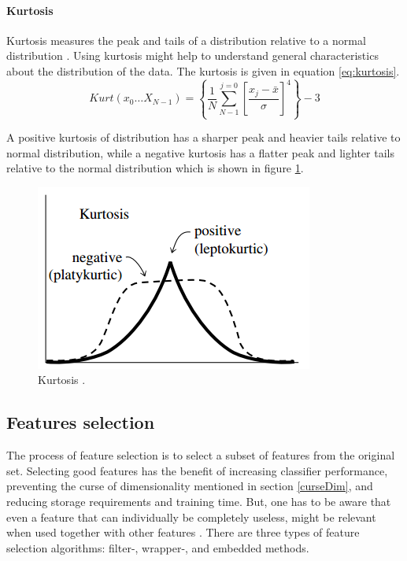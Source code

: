 \documentclass[USenglish]{ifimaster}  %
\begin{document}
	\FloatBarrier
	
\paragraph{Kurtosis}
Kurtosis measures the peak and tails of a distribution relative to a normal distribution \cite{Press:2007:NRE:1403886}. Using kurtosis might help to understand general characteristics about the distribution of the data. The kurtosis is given in equation \ref{eq:kurtosis}.
	\begin{equation}
	Kurt(x_0\dotsc X_{N-1}) = \left \{\frac{1}{N}\sum_{N-1}^{j=0}\left [ \frac{x_j-\bar{x}}{\sigma} \right ]^4 \right \}-3
	\label{eq:kurtosis}
	\end{equation}
	
A positive kurtosis of distribution has a sharper peak and heavier tails relative to normal distribution, while a negative kurtosis has a flatter peak and lighter tails relative to the normal distribution which is shown in figure \ref{fig:kurtosis}.
	
	\begin{figure}[h]
		\centering
		\includegraphics[scale=0.8]{Figures/Kurtosis}
		\caption[Kurtosis]{Kurtosis \cite{Press:2007:NRE:1403886}.}
		\label{fig:kurtosis}
	\end{figure}
	
	
	
	
\subsection{Features selection}\label{selection}	
The process of feature selection is to select a subset of features from the original set. Selecting good features has the benefit of increasing classifier performance, preventing the curse of dimensionality mentioned in section \ref{curseDim}, and reducing storage requirements and training time. But, one has to be aware that even a feature that can individually be completely useless, might be relevant when used together with other features \cite{Guyon2006}. There are three types of feature selection algorithms: filter-, wrapper-, and embedded methods. %
	
\end{document}
